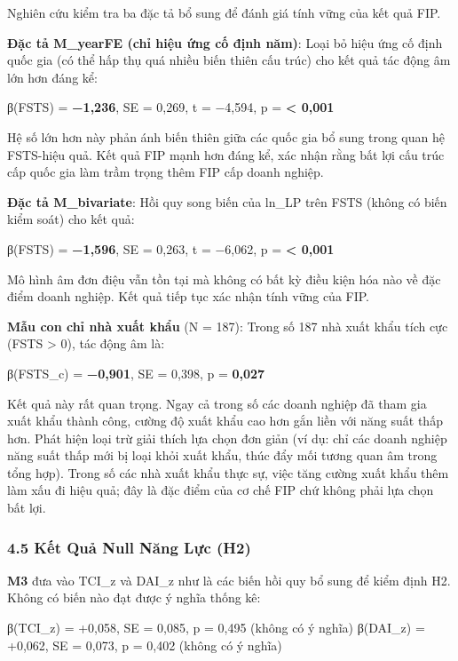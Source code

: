 \documentclass[12pt,a4paper]{article}
\begin{document}
Nghiên cứu kiểm tra ba đặc tả bổ sung để đánh giá tính vững của kết quả
FIP.

\textbf{Đặc tả M\_yearFE (chỉ hiệu ứng cố định năm)}: Loại bỏ hiệu ứng
cố định quốc gia (có thể hấp thụ quá nhiều biến thiên cấu trúc) cho kết
quả tác động âm lớn hơn đáng kể:

β(FSTS) = \textbf{−1,236}, SE = 0,269, t = −4,594, p =
\textbf{\textless{} 0,001}

Hệ số lớn hơn này phản ánh biến thiên giữa các quốc gia bổ sung trong
quan hệ FSTS-hiệu quả. Kết quả FIP mạnh hơn đáng kể, xác nhận rằng bất
lợi cấu trúc cấp quốc gia làm trầm trọng thêm FIP cấp doanh nghiệp.

\textbf{Đặc tả M\_bivariate}: Hồi quy song biến của ln\_LP trên FSTS
(không có biến kiểm soát) cho kết quả:

β(FSTS) = \textbf{−1,596}, SE = 0,263, t = −6,062, p =
\textbf{\textless{} 0,001}

Mô hình âm đơn điệu vẫn tồn tại mà không có bất kỳ điều kiện hóa nào về
đặc điểm doanh nghiệp. Kết quả tiếp tục xác nhận tính vững của FIP.

\textbf{Mẫu con chỉ nhà xuất khẩu} (N = 187): Trong số 187 nhà xuất khẩu
tích cực (FSTS \textgreater{} 0), tác động âm là:

β(FSTS\_c) = \textbf{−0,901}, SE = 0,398, p = \textbf{0,027}

Kết quả này rất quan trọng. Ngay cả trong số các doanh nghiệp đã tham
gia xuất khẩu thành công, cường độ xuất khẩu cao hơn gắn liền với năng
suất thấp hơn. Phát hiện loại trừ giải thích lựa chọn đơn giản (ví dụ:
chỉ các doanh nghiệp năng suất thấp mới bị loại khỏi xuất khẩu, thúc đẩy
mối tương quan âm trong tổng hợp). Trong số các nhà xuất khẩu thực sự,
việc tăng cường xuất khẩu thêm làm xấu đi hiệu quả; đây là đặc điểm của
cơ chế FIP chứ không phải lựa chọn bất lợi.

\hypertarget{45-kux1ebft-quux1ea3-null-nux103ng-lux1ef1c-h2}{%
\subsubsection{4.5 Kết Quả Null Năng Lực
(H2)}\label{45-kux1ebft-quux1ea3-null-nux103ng-lux1ef1c-h2}}

\textbf{M3} đưa vào TCI\_z và DAI\_z như là các biến hồi quy bổ sung để
kiểm định H2. Không có biến nào đạt được ý nghĩa thống kê:

β(TCI\_z) = +0,058, SE = 0,085, p = 0,495 (không có ý nghĩa) β(DAI\_z) =
+0,062, SE = 0,073, p = 0,402 (không có ý nghĩa)
\end{document}
